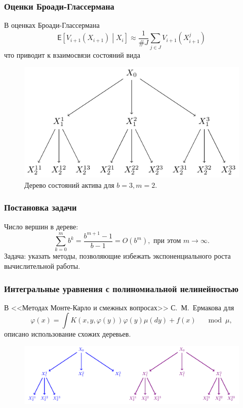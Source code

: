 \documentclass[unicode, notheorems]{beamer}
\newcommand{\bluetext}[1]{{\usebeamercolor[fg]{bluetext_color}#1}}
\newcommand{\ev}{\mathsf{E}}
\newcommand{\vfi}{\varphi}
\begin{document}
\begin{frame}
    \frametitle{Оценки Броади-Глассермана} 
    В оценках Броади-Глассермана 
    $$\ev\left[ V_{i+1}\left(X_{i+1}\right)\middle\vert X_i\right] \approx \frac{1}{\# J}\sum_{j\in J} V_{i+1}\left(X^j_{i+1}\right)$$
    что приводит к взаимосвязи состояний вида
    \begin{figure}
    \centering
    \includegraphics[width=\textwidth]{exponential_tree}
    \caption{Дерево состояний актива для $b = 3, m = 2$.}
    \label{fig:exponential_tree}
    \end{figure}
\end{frame}

\begin{frame}
    \frametitle{Постановка задачи} 
    Число вершин в дереве:
    $$\sum_{k=0}^m b^k = \frac{b^{m+1} - 1}{b-1} = O(b^m), \text{ при этом } m\to\infty.$$
    \bluetext{Задача:} указать методы, позволяющие избежать экспоненциального роста вычислительной работы. 
\end{frame}

\begin{frame}
    \frametitle{Интегральные уравнения с полиномиальной нелинейностью} 
    В <<Методах Монте-Карло и смежных вопросах>> С.~М.~Ермакова для
    $$\vfi\left(x\right) = \int K\left(x, y, \vfi\left(y\right)\right)\vfi\left(y\right) \mu\left(dy\right) + f\left(x\right) \quad \mod \mu,$$
    описано использование схожих деревьев.
    \begin{figure}
    \centering
    \includegraphics[width=\textwidth]{exponential_subtrees}
    \end{figure}
\end{frame}
\end{document}
